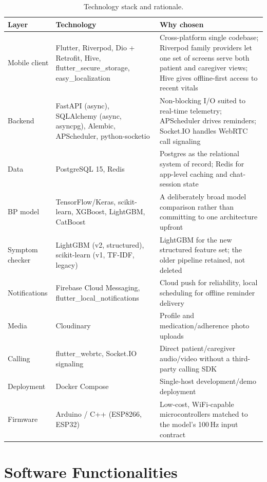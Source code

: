 \documentclass[12pt,a4paper]{report}
\begin{document}
\begin{table}[H]
\centering
\caption{Technology stack and rationale.}
\label{tab:tools}
\small
\begin{tabularx}{\linewidth}{@{}>{\raggedright\arraybackslash}p{2.4cm}>{\raggedright\arraybackslash}p{4.7cm}Y@{}}
\toprule
\textbf{Layer} & \textbf{Technology} & \textbf{Why chosen} \\
\midrule
Mobile client & Flutter, Riverpod, Dio + Retrofit, Hive,
flutter\_secure\_storage, easy\_localization &
Cross-platform single codebase; Riverpod family providers let one set of
screens serve both patient and caregiver views; Hive gives offline-first
access to recent vitals \\
Backend & FastAPI (async), SQLAlchemy (async, asyncpg), Alembic, APScheduler,
python-socketio &
Non-blocking I/O suited to real-time telemetry; APScheduler drives reminders;
Socket.IO handles WebRTC call signaling \\
Data & PostgreSQL 15, Redis &
Postgres as the relational system of record; Redis for app-level caching and
chat-session state \\
BP model & TensorFlow/Keras, scikit-learn, XGBoost, LightGBM, CatBoost &
A deliberately broad model comparison rather than committing to one
architecture upfront \\
Symptom checker & LightGBM (v2, structured), scikit-learn (v1, TF-IDF, legacy) &
LightGBM for the new structured feature set; the older pipeline retained, not
deleted \\
Notifications & Firebase Cloud Messaging, flutter\_local\_notifications &
Cloud push for reliability, local scheduling for offline reminder delivery \\
Media & Cloudinary & Profile and medication/adherence photo uploads \\
Calling & flutter\_webrtc, Socket.IO signaling &
Direct patient/caregiver audio/video without a third-party calling SDK \\
Deployment & Docker Compose & Single-host development/demo deployment \\
Firmware & Arduino / C++ (ESP8266, ESP32) &
Low-cost, WiFi-capable microcontrollers matched to the model's 100\,Hz input
contract \\
\bottomrule
\end{tabularx}
\end{table}

\section{Software Functionalities}
\end{document}
